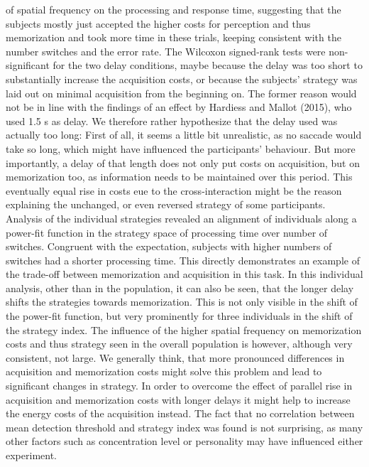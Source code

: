  of spatial frequency on the processing and response time, suggesting that the subjects mostly just accepted the higher costs for perception and thus memorization and took more time in these trials, keeping consistent with the number switches and the error rate. The Wilcoxon signed-rank tests were non-significant for the two delay conditions, maybe because the delay was too short to substantially increase the acquisition costs, or because the subjects' strategy was laid out on minimal acquisition from the beginning on. The former reason would not be in line with the findings of an effect by Hardiess and Mallot (2015), who used 1.5 s as delay. We therefore rather hypothesize that the delay used was actually too long: First of all, it seems a little bit unrealistic, as no saccade would take so long, which might have influenced the participants' behaviour. But more importantly, a delay of that length does not only put costs on acquisition, but on memorization too, as information needs to be maintained over this period. This eventually equal rise in costs eue to the cross-interaction might be the reason explaining the unchanged, or even reversed strategy of some participants. 
 \newline
 \newline
 Analysis of the individual strategies revealed an alignment of individuals along a power-fit function in the strategy space of processing time over number of switches. Congruent with the expectation, subjects with higher numbers of switches had a shorter processing time. This directly demonstrates an example of the trade-off between memorization and acquisition in this task. In this individual analysis, other than in the population, it can also be seen, that the longer delay shifts the strategies towards memorization. This is not only visible in the shift of the power-fit function, but very prominently for three individuals in the shift of the strategy index. The influence of the higher spatial frequency on memorization costs and thus strategy seen in the overall population is however, although very consistent, not large. We generally think, that more pronounced differences in acquisition and memorization costs might solve this problem and lead to significant changes in strategy. In order to overcome the effect of parallel rise in acquisition and memorization costs with longer delays it might help to increase the energy costs of the acquisition instead. 
 \newline The fact that no correlation between mean detection threshold and strategy index was found is not surprising, as many other factors such as concentration level or personality may have influenced either experiment.
